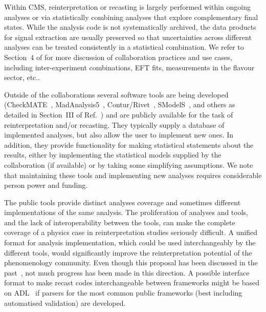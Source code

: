 \documentclass[11pt]{article}
\begin{document}
Within \gls{CMS}, reinterpretation or recasting is largely performed within ongoing analyses or via statistically combining analyses that explore complementary final states. 
While the analysis code is not systematically archived, the \glspl{data product} for signal extraction are usually preserved so that uncertainties across different analyses can be treated consistently in a statistical combination. 
We refer to Section~4 of \cite{Cranmer:2021urp} for more discussion of collaboration practices and use cases, including inter-experiment combinations, \gls{EFT} fits, measurements in the flavour sector, etc..

Outside of the collaborations several software tools are being developed (CheckMATE~\cite{Drees:2013wra,Dercks:2016npn}, MadAnalysis5~\cite{Dumont:2014tja,Conte:2018vmg}, Contur/Rivet~\cite{Buckley:2021neu}, SModelS~\cite{Kraml:2013mwa,Alguero:2021dig}, and others as detailed in Section~III of Ref.~\cite{LHCReinterpretationForum:2020xtr})
and are publicly available for the task of reinterpretation and/or recasting. 
They typically supply a database of implemented analyses, but also allow the user to implement new ones. 
In addition, they provide functionality for making statistical statements about the results, either by implementing the statistical models supplied by the collaboration (if available) or by taking some simplifying assumptions. We note that 
maintaining these tools and implementing new analyses requires considerable person power and funding. 

The public tools provide distinct analyses coverage and sometimes different implementations of the same analysis. 
The proliferation of analyses and tools, and the lack of interoperability between the tools, can make the complete coverage of a physics case in reinterpretation studies seriously difficult. 
A unified format for analysis implementation, which could be used interchangeably by the different tools, would significantly improve the reinterpretation potential of the phenomenology community. 
Even though this proposal has been discussed in the past~\cite{lukas_heinrich_2017_6362700}, not much progress has been made in this direction. A possible interface format to make recast codes interchangeable between frameworks  might be based on \gls{ADL}~\cite{adlweb, Unel:2021edl} if parsers for the most common public frameworks (best including automatised validation) are developed.  
\end{document}
